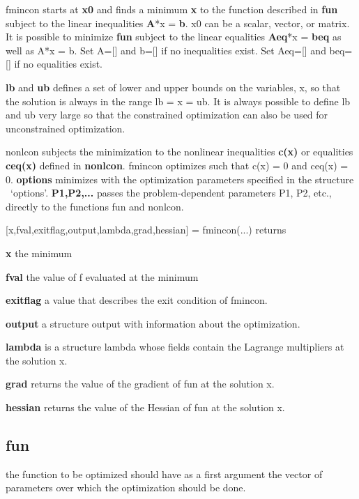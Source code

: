 \documentclass[12pt,a4paper]{article}
\begin{document}
fmincon starts at \textbf{x0} and finds a minimum \textbf{x} to the function
described in \textbf{fun} subject to the linear inequalities \textbf{A}*x 
\TEXTsymbol{<}= \textbf{b}. x0 can be a scalar, vector, or matrix. It is
possible to minimize \textbf{fun} subject to the linear equalities \textbf{%
Aeq}*x = \textbf{beq} as well as A*x \TEXTsymbol{<}= b. Set A=[] and b=[] if
no inequalities exist. Set Aeq=[] and beq=[] if no equalities exist.

\textbf{lb} and \textbf{ub} defines a set of lower and upper bounds on the
variables, x, so that the solution is always in the range lb \TEXTsymbol{<}=
x \TEXTsymbol{<}= ub. It is always possible to define lb and ub very large
so that the constrained optimization can also be used for unconstrained
optimization.

nonlcon subjects the minimization to the nonlinear inequalities \textbf{c(x)}
or equalities \textbf{ceq(x)} defined in \textbf{nonlcon}. fmincon optimizes
such that c(x) \TEXTsymbol{<}= 0 and ceq(x) = 0. \textbf{options} minimizes
with the optimization parameters specified in the structure \ `options'. 
\textbf{P1,P2,...} passes the problem-dependent parameters P1, P2, etc.,
directly to the functions fun and nonlcon. 

\bigskip 

[x,fval,exitflag,output,lambda,grad,hessian] = fmincon(...) returns 

\textbf{x} the minimum

\textbf{fval} the value of f evaluated at the minimum

\textbf{exitflag} a value that describes the exit condition of fmincon.

\textbf{output} a structure output with information about the optimization.

\textbf{lambda} is a structure lambda whose fields contain the Lagrange
multipliers at the solution x.

\textbf{grad} returns the value of the gradient of fun at the solution x.

\textbf{hessian} returns the value of the Hessian of fun at the solution x.

\subsection{fun}

the function to be optimized should have as a first argument the vector of
parameters over which the optimization should be done.
\end{document}

